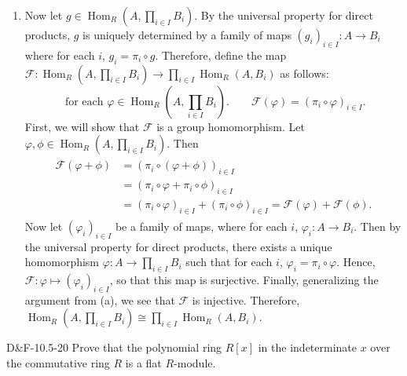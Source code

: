 \documentclass{article}
\begin{document}
\begin{enumerate}[itemsep =-2pt,label = (\alph{*})]
\begin{equation*}
			0 = \mathscr{F}(\varphi)(b) - \mathscr{F}(\phi)(b) = \mathscr{F}(\varphi - \phi)(b), 
		\end{equation*}
		so that $\varphi - \phi$ must be the trivial (i.e., zero) homomorphism. Hence, $\varphi = \phi$ so that $\mathscr{F}$ is injective. Altogether, we conclude that $\mathscr{F}$ is an isomorphism of groups. 
		\item Now let $g \in \operatorname{Hom}_{R}(A, \prod_{i \in I}B_{i})$. By the universal property for direct products, $g$ is uniquely determined by a family of maps $(g_{i})_{i \in I}: A \to B_{i}$ where for each $i$, $g_{i} = \pi_{i} \circ g$. Therefore, define the map $\mathscr{F}: \operatorname{Hom}_{R}(A, \prod_{i \in I}B_{i}) \to \prod_{i \in I}\operatorname{Hom}_{R}(A, B_{i})$ as follows: 
		\begin{equation*}
			\text{ for each $\varphi \in \operatorname{Hom}_{R}(A, \prod_{i \in I}B_{i})$}.\qquad \mathscr{F}(\varphi) = (\pi_{i} \circ \varphi)_{i \in I}. 
		\end{equation*}
		First, we will show that $\mathscr{F}$ is a group homomorphism. Let $\varphi, \phi \in \operatorname{Hom}_{R}(A, \prod_{i \in I}B_{i})$. Then 
		\begin{align*}
			\begin{split}
				\mathscr{F}(\varphi + \phi) &= (\pi_{i} \circ (\varphi + \phi))_{i \in I} \\
				&= (\pi_{i} \circ \varphi + \pi_{i} \circ \phi)_{i \in I} \\
				&= (\pi_{i} \circ \varphi)_{i \in I} + (\pi_{i} \circ \phi)_{i \in I} = \mathscr{F}(\varphi) + \mathscr{F}(\phi). 
			\end{split}
		\end{align*}
		Now let $(\varphi_{i})_{i \in I}$ be a family of maps, where for each $i$, $\varphi_{i}: A \to B_{i}$. Then by the universal property for direct products, there exists a unique homomorphism $\varphi: A \to \prod_{i \in I}B_{i}$ such that for each $i$, $\varphi_{i} = \pi_{i} \circ \varphi$. Hence, $\mathscr{F}: \varphi \mapsto (\varphi_{i})_{i \in I}$, so that this map is surjective. Finally, generalizing the argument from (a), we see that $\mathscr{F}$ is injective. Therefore, $\operatorname{Hom}_{R}(A, \prod_{i \in I}B_{i}) \cong \prod_{i \in I}\operatorname{Hom}_{R}(A, B_{i})$.
	\end{enumerate}
	
	\begin{prb}{D\&F-10.5-20}
		Prove that the polynomial ring $R[x]$ in the indeterminate $x$ over the commutative ring $R$ is a flat $R$-module. 
	\end{prb}
	
\end{document}
